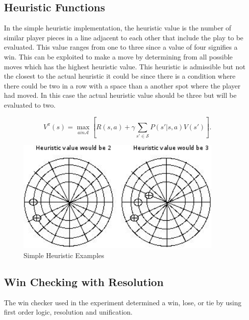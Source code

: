 \documentclass[12pt,letterpaper]{article}
\begin{document}
\subsection{Heuristic Functions}

In the simple heuristic implementation, the heuristic value is the number of similar player pieces in a line adjacent to each other that include the play to be evaluated. This value ranges from one to three since a value of four signifies a win. This can be exploited to make a move by determining from all possible moves which has the highest heuristic value. This heuristic is admissible but not the closest to the actual heuristic it could be since there is a condition where there could be two in a row with a space than a another spot where the player had moved. In this case the actual heuristic value should be three but will be evaluated to two.

\[
V^\pi(s)=\max_{a in \mathcal{A}} \left[ R(s,a) + \gamma \sum_{s' \in \mathcal{S}} P(s'|s,a) V(s') \right].
\]

\begin{figure}
\begin{center}
\includegraphics[width=4in]{heu.png}
\end{center}
\caption{Simple Heuristic Examples}
\label{heuristicExample}
\end{figure}

\subsection{Win Checking with Resolution}
The win checker used in the experiment determined a win, lose, or tie by using first order logic, resolution and unification.
\end{document}

